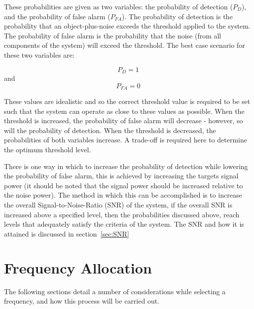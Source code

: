 \documentclass[11pt]{witseiepaper}
\begin{document}
\begin{bibunit}[witseie]
These probabilities are given as two variables: the probability of detection ($P_{D}$), and the probability of false alarm ($P_{FA}$). The probability of detection is the probability that an object-plus-noise exceeds the threshold applied to the system. The probability of false alarm is the probability that the noise (from all components of the system) will exceed the threshold.
The best case scenario for these two variables are: 

\begin{equation} \label{eqn:ProbabilityDetection}
P_{D} = 1
\end{equation} 
and 
\begin{equation} \label{eqn:ProbabilityFalseAlarm}
P_{FA} = 0
\end{equation}

These values are idealistic and so the correct threshold value is required to be set such that the system can operate as close to these values as possible.
When the threshold is increased, the probability of false alarm will decrease - however, so will the probability of detection. When the threshold is decreased, the probabilities of both variables increase. A trade-off is required here to determine the optimum threshold level.

There is one way in which to increase the probability of detection while lowering the probability of false alarm, this is achieved by increasing the targets signal power (it should be noted that the signal power should be increased relative to the noise power). The method in which this can be accomplished is to increase the overall Signal-to-Noise-Ratio (SNR) of the system, if the overall SNR is increased above a specified level, then the probabilities discussed above, reach levels that adequately satisfy the criteria of the system. The SNR and how it is attained is discussed in section~\ref{sec:SNR}


\section{Frequency Allocation} \label{sec:FrequencyAllocation}
The following sections detail a number of considerations while selecting a frequency, and how this process will be carried out.


\end{bibunit}
\end{document}

